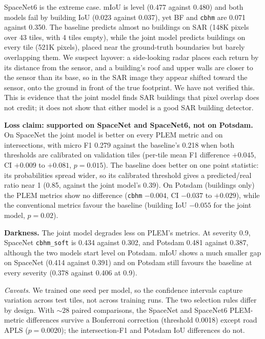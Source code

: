 SpaceNet6 is the extreme case. mIoU is level (0.477 against 0.480) and both models fail by building
IoU (0.023 against 0.037), yet BF and \texttt{cbhm} are 0.071 against 0.350. The baseline predicts
almost no buildings on SAR (148K pixels over 43 tiles, with 4 tiles empty), while the joint model
predicts buildings on every tile (521K pixels), placed near the ground-truth boundaries but barely
overlapping them. We suspect layover: a side-looking radar places each return by its distance
from the sensor, and a building's roof and upper walls are closer to the sensor than its base, so
in the SAR image they appear shifted toward the sensor, onto the ground in front of the true
footprint. We have not verified this. This is evidence that the joint model finds SAR buildings that pixel
overlap does not credit; it does not show that either model is a good SAR building detector.

\textbf{Loss claim: supported on SpaceNet and SpaceNet6, not on Potsdam.} On SpaceNet the joint
model is better on every PLEM metric and on intersections, with micro F1 0.279 against the
baseline's 0.218 when both thresholds are calibrated on validation tiles (per-tile mean F1
difference $+0.045$, CI $+0.009$ to $+0.081$, $p = 0.015$). The baseline does better on one point
statistic: its probabilities spread wider, so its calibrated threshold gives a predicted/real ratio
near 1 (0.85, against the joint model's 0.39). On Potsdam (buildings only) the PLEM metrics show no
difference (\texttt{cbhm} $-0.004$, CI $-0.037$ to $+0.029$), while the conventional metrics favour
the baseline (building IoU $-0.055$ for the joint model, $p = 0.02$).

\textbf{Darkness.} The joint model degrades less on PLEM's metrics. At severity 0.9, SpaceNet
\texttt{cbhm\_soft} is 0.434 against 0.302, and Potsdam 0.481 against 0.387, although the two
models start level on Potsdam. mIoU shows a much smaller gap on SpaceNet (0.414 against 0.391) and
on Potsdam still favours the baseline at every severity (0.378 against 0.406 at 0.9).

\emph{Caveats.} We trained one seed per model, so the confidence intervals capture variation across
test tiles, not across training runs. The two selection rules differ by design. With ${\sim}28$
paired comparisons, the SpaceNet and SpaceNet6 PLEM-metric differences survive a Bonferroni
correction (threshold 0.0018) except road APLS ($p = 0.0020$); the intersection-F1 and Potsdam IoU
differences do not.
